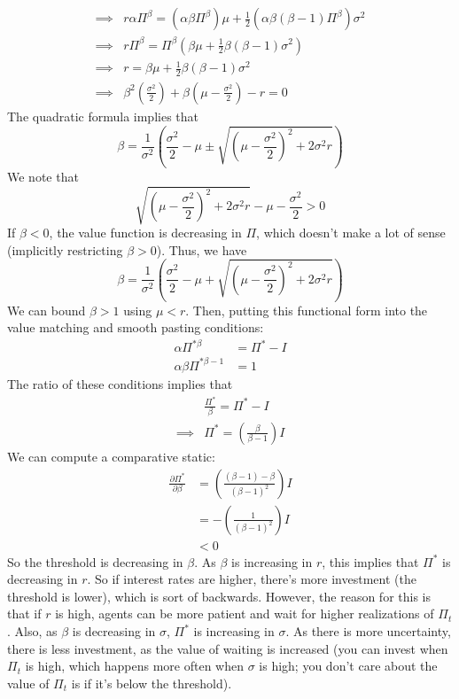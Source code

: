 \documentclass[12pt]{article}
\begin{document}
\begin{itemize}
\[\begin{split}
        \implies &r\alpha \Pi^{\beta} =\left(\alpha\beta \Pi^{\beta}\right)\mu + \frac{1}{2}\left(\alpha\beta(\beta - 1)\Pi^{\beta}\right)\sigma^2 \\
        \implies &r\Pi^{\beta} =\Pi^{\beta}\left(\beta \mu + \frac{1}{2}\beta(\beta - 1)\sigma^2\right) \\
        \implies &r =\beta \mu + \frac{1}{2}\beta(\beta - 1)\sigma^2 \\
        \implies &\beta^2\left(\frac{\sigma^2}{2}\right) + \beta\left(\mu-\frac{\sigma^2}{2}\right) - r = 0
    \end{split}\]
    The quadratic formula implies that
    \[\beta = \frac{1}{\sigma^2}\left(\frac{\sigma^2}{2} - \mu \pm \sqrt{\left(\mu - \frac{\sigma^2}{2}\right)^2 + 2\sigma^2r}\right)\]
    We note that
    \[\sqrt{\left(\mu - \frac{\sigma^2}{2}\right)^2 + 2\sigma^2r}-\mu - \frac{\sigma^2}{2} > 0\]
    If $\beta < 0$, the value function is decreasing in $\Pi$, which doesn't make a lot of sense (implicitly restricting $\beta > 0$). Thus, we have
    \[\beta = \frac{1}{\sigma^2}\left(\frac{\sigma^2}{2} - \mu + \sqrt{\left(\mu - \frac{\sigma^2}{2}\right)^2 + 2\sigma^2r}\right)\]
    We can bound $\beta > 1$ using $\mu < r$. Then, putting this functional form into the value matching and smooth pasting conditions:
    \[\begin{split}
        \alpha\Pi^{*\beta} &= \Pi^* - I \\
        \alpha\beta \Pi^{*\beta - 1} &= 1
    \end{split}\]
    The ratio of these conditions implies that
    \[\begin{split}
        &\frac{\Pi^*}{\beta} = \Pi^* - I \\
        \implies &\Pi^* = \left(\frac{\beta}{\beta - 1}\right)I
    \end{split}\]
    We can compute a comparative static:
    \[\begin{split}
         \frac{\partial \Pi^*}{\partial \beta} &= \left(\frac{(\beta-1)-\beta}{(\beta - 1)^2}\right)I \\
         &= -\left(\frac{1}{(\beta - 1)^2}\right)I \\
         &<0
    \end{split}\]
    So the threshold is decreasing in $\beta$. As $\beta$ is increasing in $r$, this implies that $\Pi^*$ is decreasing in $r$. So if interest rates are higher, there's more investment (the threshold is lower), which is sort of backwards. However, the reason for this is that if $r$ is high, agents can be more patient and wait for higher realizations of $\Pi_t$. Also, as $\beta$ is decreasing in $\sigma$, $\Pi^*$ is increasing in $\sigma$. As there is more uncertainty, there is less investment, as the value of waiting is increased (you can invest when $\Pi_t$ is high, which happens more often when $\sigma$ is high; you don't care about the value of $\Pi_t$ is if it's below the threshold).

\end{itemize}
\end{document}
